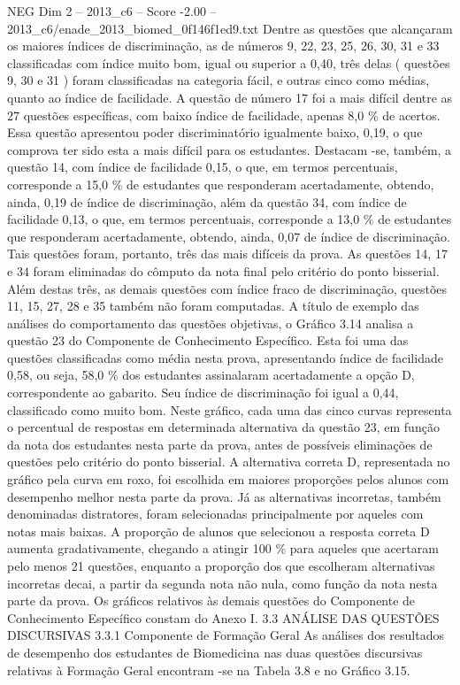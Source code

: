 \begin{textsample}{NEG Dim 2 – 2013\_c6 – Score -2.00 – 2013\_c6/enade\_2013\_biomed\_0f146f1ed9.txt}
Dentre as questões que alcançaram os maiores índices de discriminação, as de números 9, 22, 23, 25, 26, 30, 31 e 33 classificadas com índice muito bom, igual ou superior a 0,40, três delas ( questões 9, 30 e 31 ) foram classificadas na categoria fácil, e outras cinco como médias, quanto ao índice de facilidade.
A questão de número 17 foi a mais difícil dentre as 27 questões específicas, com baixo índice de facilidade, apenas 8,0 \% de acertos.
Essa questão apresentou poder discriminatório igualmente baixo, 0,19, o que comprova ter sido esta a mais difícil para os estudantes.
Destacam -se, também, a questão 14, com índice de facilidade 0,15, o que, em termos percentuais, corresponde a 15,0 \% de estudantes que responderam acertadamente, obtendo, ainda, 0,19 de índice de discriminação, além da questão 34, com índice de facilidade 0,13, o que, em termos percentuais, corresponde a 13,0 \% de estudantes que responderam acertadamente, obtendo, ainda, 0,07 de índice de discriminação.
Tais questões foram, portanto, três das mais difíceis da prova.
As questões 14, 17 e 34 foram eliminadas do cômputo da nota final pelo critério do ponto bisserial.
Além destas três, as demais questões com índice fraco de discriminação, questões 11, 15, 27, 28 e 35 também não foram computadas.
A título de exemplo das análises do comportamento das questões objetivas, o Gráfico 3.14 analisa a questão 23 do Componente de Conhecimento Específico.
Esta foi uma das questões classificadas como média nesta prova, apresentando índice de facilidade 0,58, ou seja, 58,0 \% dos estudantes assinalaram acertadamente a opção D, correspondente ao gabarito.
Seu índice de discriminação foi igual a 0,44, classificado como muito bom.
Neste gráfico, cada uma das cinco curvas representa o percentual de respostas em determinada alternativa da questão 23, em função da nota dos estudantes nesta parte da prova, antes de possíveis eliminações de questões pelo critério do ponto bisserial.
A alternativa correta D, representada no gráfico pela curva em roxo, foi escolhida em maiores proporções pelos alunos com desempenho melhor nesta parte da prova.
Já as alternativas incorretas, também denominadas distratores, foram selecionadas principalmente por aqueles com notas mais baixas.
A proporção de alunos que selecionou a resposta correta D aumenta gradativamente, chegando a atingir 100 \% para aqueles que acertaram pelo menos 21 questões, enquanto a proporção dos que escolheram alternativas incorretas decai, a partir da segunda nota não nula, como função da nota nesta parte da prova.
Os gráficos relativos às demais questões do Componente de Conhecimento Específico constam do Anexo I. 3.3 ANÁLISE DAS QUESTÕES DISCURSIVAS 3.3.1 Componente de Formação Geral As análises dos resultados de desempenho dos estudantes de Biomedicina nas duas questões discursivas relativas à Formação Geral encontram -se na Tabela 3.8 e no Gráfico 3.15.

\end{textsample}
